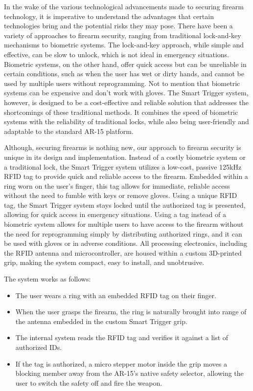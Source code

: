 In the wake of the various technological advancements made to securing firearm technology, it is imperative to understand the advantages that certain technologies bring and the potential risks they may pose. There have been a variety of approaches to firearm security, ranging from traditional lock-and-key mechanisms to biometric systems. The lock-and-key approach, while simple and effective, can be slow to unlock, which is not ideal in emergency situations. Biometric systems, on the other hand, offer quick access but can be unreliable in certain conditions, such as when the user has wet or dirty hands, and cannot be used by multiple users without reprogramming. Not to mention that biometric systems can be expensive and don't work with gloves. The Smart Trigger system, however, is designed to be a cost-effective and reliable solution that addresses the shortcomings of these traditional methods. It combines the speed of biometric systems with the reliability of traditional locks, while also being user-friendly and adaptable to the standard AR-15 platform.

Although, securing firearms is nothing new, our approach to firearm security is unique in its design and implementation. Instead of a costly biometric system or a traditional lock, the Smart Trigger system utilizes a low-cost, passive 125kHz RFID tag to provide quick and reliable access to the firearm. Embedded within a ring worn on the user's finger, this tag allows for immediate, reliable access without the need to fumble with keys or remove gloves. Using a unique RFID tag, the Smart Trigger system stays locked until the authorized tag is presented, allowing for quick access in emergency situations. Using a tag instead of a biometric system allows for multiple users to have access to the firearm without the need for reprogramming simply by distributing authorized rings, and it can be used with gloves or in adverse conditions. All processing electronics, including the RFID antenna and microcontroller, are housed within a custom 3D-printed grip, making the system compact, easy to install, and unobtrusive.

The system works as follows:
\begin{itemize}
    \item The user wears a ring with an embedded RFID tag on their finger.
    \item When the user grasps the firearm, the ring is naturally brought into range of the antenna embedded in the custom Smart Trigger grip.
    \item The internal system reads the RFID tag and verifies it against a list of authorized IDs.
    \item If the tag is authorized, a micro stepper motor inside the grip moves a blocking member away from the AR-15's native safety selector, allowing the user to switch the safety off and fire the weapon.
\end{itemize}

